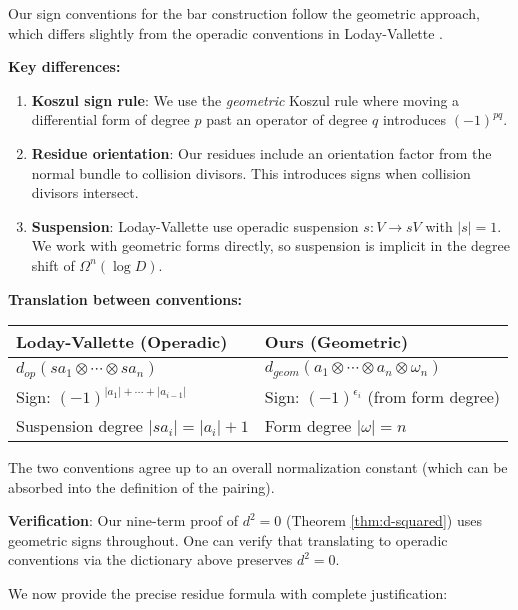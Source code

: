 \begin{remark}\label{rem:LV-signs}
Our sign conventions for the bar construction follow the geometric approach, which differs slightly from the operadic conventions in Loday-Vallette \cite{LodayVallette}.

\textbf{Key differences:}
\begin{enumerate}
\item \textbf{Koszul sign rule}: We use the \emph{geometric} Koszul rule where moving a differential form of degree $p$ past an operator of degree $q$ introduces $(-1)^{pq}$.

\item \textbf{Residue orientation}: Our residues include an orientation factor from the normal bundle to collision divisors. This introduces signs when collision divisors intersect.

\item \textbf{Suspension}: Loday-Vallette use operadic suspension $s: V \to sV$ with $|s| = 1$. We work with geometric forms directly, so suspension is implicit in the degree shift of $\Omega^n(\log D)$.
\end{enumerate}

\textbf{Translation between conventions:}
\begin{center}
\begin{tabular}{|l|l|}
\hline
\textbf{Loday-Vallette (Operadic)} & \textbf{Ours (Geometric)} \\
\hline
$d_{op}(s a_1 \otimes \cdots \otimes s a_n)$ & $d_{geom}(a_1 \otimes \cdots \otimes a_n \otimes \omega_n)$ \\
Sign: $(-1)^{|a_1| + \cdots + |a_{i-1}|}$ & Sign: $(-1)^{\epsilon_i}$ (from form degree) \\
Suspension degree $|s a_i| = |a_i| + 1$ & Form degree $|\omega| = n$ \\
\hline
\end{tabular}
\end{center}

The two conventions agree up to an overall normalization constant (which can be absorbed into the definition of the pairing).

\textbf{Verification}: Our nine-term proof of $d^2 = 0$ (Theorem \ref{thm:d-squared}) uses geometric signs throughout. One can verify that translating to operadic conventions via the dictionary above preserves $d^2 = 0$.
\end{remark}
 
We now provide the precise residue formula with complete justification:
 

